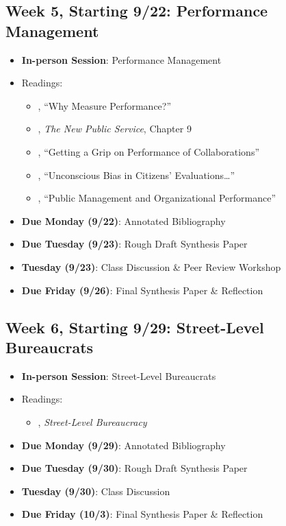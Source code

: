 \documentclass[12pt]{article}     %
\begin{document}
\subsection*{Week 5, Starting 9/22: Performance Management}
\begin{itemize}
    \item \textbf{In-person Session}: Performance Management
    \item Readings:
        \begin{itemize}
            \item \citet{Behn2003}, ``Why Measure Performance?'' 
            \item \citet{Denhardt2015}, \emph{The New Public Service}, Chapter 9 
            \item \citet{douglas2021}, ``Getting a Grip on Performance of Collaborations'' 
            \item \citet{marvel2015}, ``Unconscious Bias in Citizens' Evaluations\dots'' 
            \item \citet{nicholson-crotty2004}, ``Public Management and Organizational Performance'' 
        \end{itemize}
    \item \textbf{Due Monday (9/22)}: Annotated Bibliography
    \item \textbf{Due Tuesday (9/23)}: Rough Draft Synthesis Paper
    \item \textbf{Tuesday (9/23)}: Class Discussion \& Peer Review Workshop
    \item \textbf{Due Friday (9/26)}: Final Synthesis Paper \& Reflection
\end{itemize}

\subsection*{Week 6, Starting 9/29: Street-Level Bureaucrats}
\begin{itemize}
    \item \textbf{In-person Session}: Street-Level Bureaucrats
    \item Readings:
        \begin{itemize}
            \item \citet{Lipsky2010}, \emph{Street-Level Bureaucracy}
        \end{itemize}
    \item \textbf{Due Monday (9/29)}: Annotated Bibliography
    \item \textbf{Due Tuesday (9/30)}: Rough Draft Synthesis Paper
    \item \textbf{Tuesday (9/30)}: Class Discussion
    \item \textbf{Due Friday (10/3)}: Final Synthesis Paper \& Reflection
\end{itemize}
\end{document}
